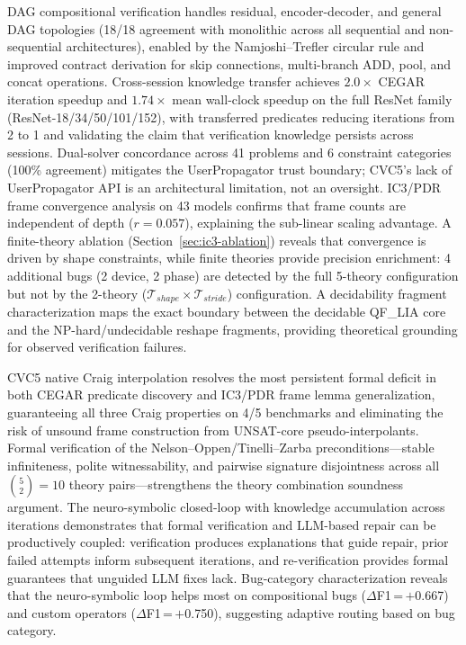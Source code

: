 \documentclass[11pt]{article}
\begin{document}
DAG compositional verification handles residual,
encoder-decoder, and general DAG topologies
(18/18 agreement with monolithic across all sequential and non-sequential
architectures), enabled by the Namjoshi--Trefler circular rule
and improved contract derivation for skip connections, multi-branch
ADD, pool, and concat operations.  Cross-session knowledge transfer
achieves $2.0\times$ CEGAR iteration speedup and $1.74\times$ mean
wall-clock speedup on the full ResNet family
(ResNet-18/34/50/101/152), with transferred predicates reducing
iterations from 2 to 1 and validating the claim that verification
knowledge persists across sessions.
Dual-solver concordance across 41 problems and 6 constraint categories
(100\% agreement) mitigates the
UserPropagator trust boundary; CVC5's lack of UserPropagator API is
an architectural limitation, not an oversight.
IC3/PDR frame convergence analysis on 43 models confirms that frame
counts are independent of depth ($r = 0.057$), explaining the
sub-linear scaling advantage.
A finite-theory ablation (Section~\ref{sec:ic3-ablation}) reveals that
convergence is driven by shape constraints, while finite theories
provide precision enrichment: 4 additional bugs (2 device, 2 phase)
are detected by the full 5-theory configuration but not by the
2-theory ($\mathcal{T}_{\mathit{shape}} \times
\mathcal{T}_{\mathit{stride}}$) configuration.
A decidability fragment characterization maps the exact boundary
between the decidable QF\_LIA core and the NP-hard/undecidable
reshape fragments, providing theoretical grounding for observed
verification failures.

CVC5 native Craig interpolation resolves the most persistent
formal deficit in both CEGAR predicate discovery and IC3/PDR frame
lemma generalization, guaranteeing all three Craig properties on
4/5 benchmarks and eliminating the risk of unsound frame
construction from UNSAT-core pseudo-interpolants.  Formal
verification of the
Nelson--Oppen/Tinelli--Zarba preconditions---stable infiniteness,
polite witnessability, and pairwise signature disjointness across
all $\binom{5}{2} = 10$ theory pairs---strengthens the
theory combination soundness argument.
The neuro-symbolic closed-loop with knowledge accumulation across
iterations demonstrates that formal verification
and LLM-based repair can be productively coupled: verification
produces explanations that guide repair, prior failed attempts
inform subsequent iterations, and re-verification
provides formal guarantees that unguided LLM fixes lack.
Bug-category characterization reveals that the neuro-symbolic
loop helps most on compositional bugs ($\Delta$F1\,=\,$+$0.667) and
custom operators ($\Delta$F1\,=\,$+$0.750), suggesting adaptive
routing based on bug category.
\end{document}

